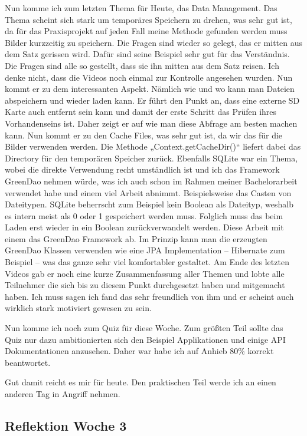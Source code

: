\documentclass[12pt,a4paper,bibliography=totocnumbered,listof=totocnumbered]{scrartcl}
\begin{document}
Nun komme ich zum letzten Thema für Heute, das Data Management. 
Das Thema scheint sich stark um temporäres Speichern zu drehen, was sehr gut ist, da für das Praxisprojekt auf jeden Fall meine Methode gefunden werden muss Bilder kurzzeitig zu speichern. Die Fragen sind wieder so gelegt, das er mitten aus dem Satz gerissen wird. Dafür sind seine Beispiel sehr gut für das Verständnis. Die Fragen sind alle so gestellt, dass sie ihn mitten aus dem Satz reisen. Ich denke nicht, dass die Videos noch einmal zur Kontrolle angesehen wurden.
Nun kommt er zu dem interessanten Aspekt. Nämlich wie und wo kann man Dateien abspeichern und wieder laden kann. Er führt den Punkt an, dass eine externe SD Karte auch entfernt sein kann und damit der erste Schritt das Prüfen ihres Vorhandenseins ist. Daher zeigt er auf wie man diese Abfrage am besten machen kann. Nun kommt er zu den Cache Files, was sehr gut ist, da wir das für die Bilder verwenden werden. Die Methode „Context.getCacheDir()“ liefert dabei das Directory für den temporären Speicher zurück. Ebenfalls SQLite war ein Thema, wobei die direkte Verwendung recht umständlich ist und ich das Framework GreenDao nehmen würde, was ich auch schon im Rahmen meiner Bachelorarbeit verwendet habe und einem viel Arbeit abnimmt. Beispielsweise das Casten von Dateitypen. SQLite beherrscht zum Beispiel kein Boolean als Dateityp, weshalb es intern meist als 0 oder 1 gespeichert werden muss. Folglich muss das beim Laden erst wieder in ein Boolean zurückverwandelt werden. Diese Arbeit mit einem das GreenDao Framework ab. Im Prinzip kann man die erzeugten GreenDao Klassen verwenden wie eine JPA Implementation – Hibernate zum Beispiel – was das ganze sehr viel komfortabler gestaltet.  
Am Ende des letzten Videos gab er noch eine kurze Zusammenfassung aller Themen und lobte alle Teilnehmer die sich bis zu diesem Punkt durchgesetzt haben und mitgemacht haben. Ich muss sagen ich fand das sehr freundlich von ihm und er scheint auch wirklich stark motiviert gewesen zu sein. 

Nun komme ich noch zum Quiz für diese Woche. 
Zum größten Teil sollte das Quiz nur dazu ambitionierten sich den Beispiel Applikationen und einige API Dokumentationen anzusehen. Daher war habe ich auf Anhieb 80\% korrekt beantwortet. 

Gut damit reicht es mir für heute. Den praktischen Teil werde ich an einen anderen Tag in Angriff nehmen. 

\subsection{Reflektion Woche 3}
\end{document}
